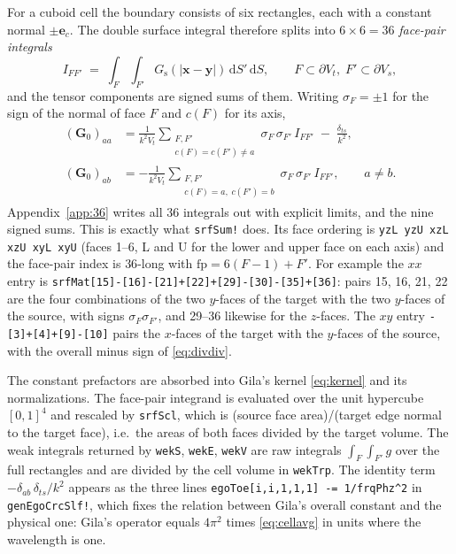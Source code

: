\documentclass[11pt]{article}
\theoremstyle{remark}
\newcommand{\dd}{\mathrm{d}}
\newcommand{\code}[1]{\texttt{#1}}
\newcommand{\Gs}{G_{\mathrm{s}}}
\begin{document}
For a cuboid cell the boundary consists of six rectangles, each with a constant
normal $\pm\mathbf{e}_c$. The double surface integral therefore splits into $6\times 6
= 36$ \emph{face-pair integrals}
\begin{equation}
I_{FF'} \;=\; \int_{F}\!\int_{F'} \Gs(|\mathbf{x}-\mathbf{y}|)\,\dd S'\,\dd S,
\qquad F\subset\partial V_t,\; F'\subset\partial V_s,
\label{eq:facepair}
\end{equation}
and the tensor components are signed sums of them. Writing $\sigma_F = \pm 1$ for the
sign of the normal of face $F$ and $c(F)$ for its axis,
\begin{align}
(\mathbf{G}_0)_{aa} &= \frac{1}{k^2 V_t}\sum_{\substack{F,F'\\ c(F)=c(F')\neq a}}
\sigma_F\,\sigma_{F'}\, I_{FF'} \;-\; \frac{\delta_{ts}}{k^2}, \\
(\mathbf{G}_0)_{ab} &= -\frac{1}{k^2 V_t}\sum_{\substack{F,F'\\ c(F)=a,\; c(F')=b}}
\sigma_F\,\sigma_{F'}\, I_{FF'}, \qquad a\neq b .
\end{align}
Appendix~\ref{app:36} writes all 36 integrals out with explicit limits, and the nine
signed sums. This is exactly what \code{srfSum!} does. Its face ordering is
\code{yzL yzU xzL xzU xyL xyU} (faces 1--6, L and U for the lower and upper face on
each axis) and the face-pair index is $36$-long with $\mathrm{fp} = 6(F-1)+F'$. For
example the $xx$ entry is
\code{srfMat[15]-[16]-[21]+[22]+[29]-[30]-[35]+[36]}: pairs 15, 16, 21, 22 are the
four combinations of the two $y$-faces of the target with the two $y$-faces of the
source, with signs $\sigma_F\sigma_{F'}$, and 29--36 likewise for the $z$-faces. The
$xy$ entry \code{-[3]+[4]+[9]-[10]} pairs the $x$-faces of the target with the
$y$-faces of the source, with the overall minus sign of \eqref{eq:divdiv}.

The constant prefactors are absorbed into Gila's kernel \eqref{eq:kernel} and its
normalizations. The face-pair integrand is evaluated over the unit hypercube
$[0,1]^4$ and rescaled by \code{srfScl}, which is (source face area)/(target
edge normal to the target face), i.e.\ the areas of both faces divided by the target
volume. The weak integrals returned by \code{wekS}, \code{wekE}, \code{wekV} are raw
integrals $\int_F\int_{F'} g$ over the full rectangles and are divided by the cell
volume in \code{wekTrp}. The identity term $-\delta_{ab}\,\delta_{ts}/k^2$ appears as
the three lines \code{egoToe[i,i,1,1,1] -= 1/frqPhz\textasciicircum 2} in
\code{genEgoCrcSlf!}, which fixes the relation between Gila's overall constant and the
physical one: Gila's operator equals $4\pi^2$ times \eqref{eq:cellavg} in units where
the wavelength is one.
\end{document}
